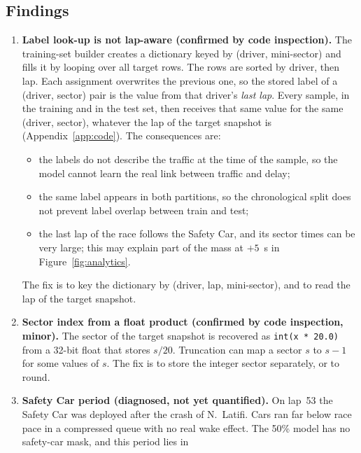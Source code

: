 \documentclass[11pt,a4paper]{article}
\begin{document}
\subsection{Findings}
\begin{enumerate}[leftmargin=*]
  \item \textbf{Label look-up is not lap-aware (confirmed by code
        inspection).} The training-set builder creates a dictionary keyed by
        (driver, mini-sector) and fills it by looping over all target rows.
        The rows are sorted by driver, then lap. Each assignment overwrites
        the previous one, so the stored label of a (driver, sector) pair is
        the value from that driver's \emph{last lap}. Every sample, in the
        training and in the test set, then receives that same value for the
        same (driver, sector), whatever the lap of the target snapshot is
        (Appendix~\ref{app:code}). The consequences are:
        \begin{itemize}
          \item the labels do not describe the traffic at the time of the
                sample, so the model cannot learn the real link between
                traffic and delay;
          \item the same label appears in both partitions, so the chronological
                split does not prevent label overlap between train and test;
          \item the last lap of the race follows the Safety Car, and its
                sector times can be very large; this may explain part of the
                mass at $+5$~s in Figure~\ref{fig:analytics}.
        \end{itemize}
        The fix is to key the dictionary by (driver, lap, mini-sector), and
        to read the lap of the target snapshot.
  \item \textbf{Sector index from a float product (confirmed by code
        inspection, minor).} The sector of the target snapshot is recovered
        as \texttt{int(x * 20.0)} from a 32-bit float that stores $s/20$.
        Truncation can map a sector $s$ to $s-1$ for some values of $s$. The
        fix is to store the integer sector separately, or to round.
  \item \textbf{Safety Car period (diagnosed, not yet quantified).} On
        lap~53 the Safety Car was deployed after the crash of N.~Latifi. Cars
        ran far below race pace in a compressed queue with no real wake
        effect. The 50\% model has no safety-car mask, and this period lies in

\end{enumerate}
\end{document}
